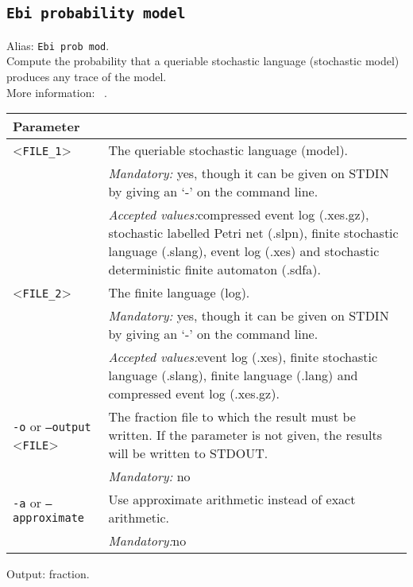 {\subsection{\texttt{Ebi probability model}}
\label{command:Ebi probability model}
Alias: \texttt{Ebi prob mod}.\\
Compute the probability that a queriable stochastic language (stochastic model) produces any trace of the model.\\
More information: ~\cite{DBLP:journals/is/LeemansMM24}.\\
\begin{tabularx}{\linewidth}{lX}
\toprule
Parameter \\\midrule
<\texttt{FILE\_1}>&The queriable stochastic language (model).\\
&\textit{Mandatory:} \quad yes, though it can be given on STDIN by giving an `-' on the command line.\\
&\textit{Accepted values:}\quad compressed event log (.xes.gz), stochastic labelled Petri net (.slpn), finite stochastic language (.slang), event log (.xes) and stochastic deterministic finite automaton (.sdfa).\\
<\texttt{FILE\_2}>&The finite language (log).\\
&\textit{Mandatory:} \quad yes, though it can be given on STDIN by giving an `-' on the command line.\\
&\textit{Accepted values:}\quad event log (.xes), finite stochastic language (.slang), finite language (.lang) and compressed event log (.xes.gz).\\
\texttt{-o} or \texttt{--output} <\texttt{FILE}> &
The fraction file to which the result must be written. If the parameter is not given, the results will be written to STDOUT.\\
&\textit{Mandatory:} \quad no\\
\texttt{-a} or \texttt{--approximate} & Use approximate arithmetic instead of exact arithmetic.\\
&\textit{Mandatory:}\quad no\\
\bottomrule
\end{tabularx}
Output: fraction.
}
